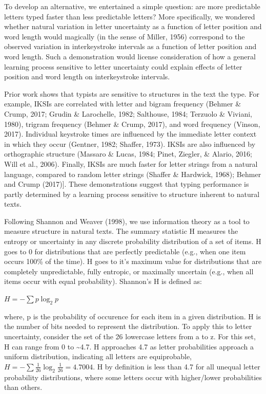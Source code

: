 \documentclass[floatsintext,man]{apa6}
\theoremstyle{definition}
\theoremstyle{definition}
\theoremstyle{definition}
\theoremstyle{remark}
\begin{document}
To develop an alternative, we entertained a simple question: are more
predictable letters typed faster than less predictable letters? More
specifically, we wondered whether natural variation in letter
uncertainty as a function of letter position and word length would
magically (in the sense of Miller, 1956) correspond to the observed
variation in interkeystroke intervals as a function of letter position
and word length. Such a demonstration would license consideration of how
a general learning process sensitive to letter uncertainty could explain
effects of letter position and word length on interkeystroke intervals.

Prior work shows that typists are sensitive to structures in the text
the type. For example, IKSIs are correlated with letter and bigram
frequency (Behmer \& Crump, 2017; Grudin \& Larochelle, 1982; Salthouse,
1984; Terzuolo \& Viviani, 1980), trigram frequency (Behmer \& Crump,
2017), and word frequency (Vinson, 2017). Individual keystroke times are
influenced by the immediate letter context in which they occur (Gentner,
1982; Shaffer, 1973). IKSIs are also influenced by orthographic
structure (Massaro \& Lucas, 1984; Pinet, Ziegler, \& Alario, 2016; Will
et al., 2006). Finally, IKSIs are much faster for letter strings from a
natural language, compared to random letter strings (Shaffer \&
Hardwick, 1968); Behmer and Crump (2017){]}. These demonstrations
suggest that typing performance is partly determined by a learning
process sensitive to structure inherent to natural texts.

Following Shannon and Weaver (1998), we use information theory as a tool
to measure structure in natural texts. The summary statistic H measures
the entropy or uncertainty in any discrete probability distribution of a
set of items. H goes to 0 for distributions that are perfectly
predictable (e.g., when one item occurs 100\% of the time). H goes to
it's maximum value for distributions that are completely unpredictable,
fully entropic, or maximally uncertain (e.g., when all items occur with
equal probability). Shannon's H is defined as:

\(H = -\sum p \log_2 p\)

where, p is the probability of occurence for each item in a given
distribution. H is the number of bits needed to represent the
distribution. To apply this to letter uncertainty, consider the set of
the 26 lowercase letters from a to z. For this set, H can range from 0
to \textasciitilde{}4.7. H approaches 4.7 as letter probabilities
approach a uniform distribution, indicating all letters are
equiprobable, \(H = -\sum \frac{1}{26} \log_2 \frac{1}{26} = 4.7004\). H
by definition is less than 4.7 for all unequal letter probability
distributions, where some letters occur with higher/lower probabilities
than others.
\end{document}
